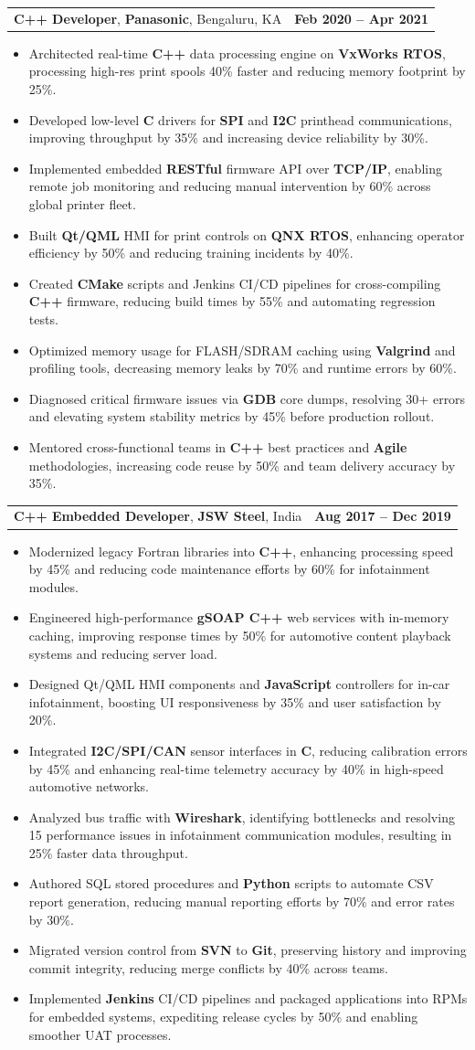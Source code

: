 \documentclass[letterpaper,11pt]{article}
\makeatletter
\newcommand{\resumeItem}[1]{
  \item\footnotesize{
    {#1 \vspace{-2pt}}
  }
}
\newcommand{\resumeSubheading}[4]{
  \vspace{-2pt}\item
    \begin{tabular*}{1.0\textwidth}[t]{l@{\extracolsep{\fill}}r}
      \textbf{\fontsize{10pt}{14pt}\selectfont #3}, \textbf{\fontsize{10pt}{14pt}\selectfont #1}, \fontsize{10pt}{14pt}\selectfont #4 & \textbf{\fontsize{10pt}{14pt}\selectfont #2} \\
    \end{tabular*}\vspace{-7pt}
}
\newcommand{\resumeItemListStart}{\begin{itemize}[leftmargin=*]}
\newcommand{\resumeItemListEnd}{\end{itemize}\vspace{-5pt}}
\makeatother
\begin{document}
    \resumeSubheading
        {Panasonic}{Feb 2020 -- Apr 2021}
        {C++ Developer}{Bengaluru, KA}
      \resumeItemListStart
        \resumeItem{Architected real-time \textbf{C++} data processing engine on \textbf{VxWorks RTOS}, processing high-res print spools 40\% faster and reducing memory footprint by 25\%.}
        \resumeItem{Developed low-level \textbf{C} drivers for \textbf{SPI} and \textbf{I2C} printhead communications, improving throughput by 35\% and increasing device reliability by 30\%.}
        \resumeItem{Implemented embedded \textbf{RESTful} firmware API over \textbf{TCP/IP}, enabling remote job monitoring and reducing manual intervention by 60\% across global printer fleet.}
        \resumeItem{Built \textbf{Qt/QML} HMI for print controls on \textbf{QNX RTOS}, enhancing operator efficiency by 50\% and reducing training incidents by 40\%.}
        \resumeItem{Created \textbf{CMake} scripts and Jenkins CI/CD pipelines for cross-compiling \textbf{C++} firmware, reducing build times by 55\% and automating regression tests.}
        \resumeItem{Optimized memory usage for FLASH/SDRAM caching using \textbf{Valgrind} and profiling tools, decreasing memory leaks by 70\% and runtime errors by 60\%.}
        \resumeItem{Diagnosed critical firmware issues via \textbf{GDB} core dumps, resolving 30+ errors and elevating system stability metrics by 45\% before production rollout.}
        \resumeItem{Mentored cross-functional teams in \textbf{C++} best practices and \textbf{Agile} methodologies, increasing code reuse by 50\% and team delivery accuracy by 35\%.}
      \resumeItemListEnd

    \resumeSubheading
        {JSW Steel}{Aug 2017 -- Dec 2019}
        {C++ Embedded Developer}{India}
      \resumeItemListStart
        \resumeItem{Modernized legacy Fortran libraries into \textbf{C++}, enhancing processing speed by 45\% and reducing code maintenance efforts by 60\% for infotainment modules.}
        \resumeItem{Engineered high-performance \textbf{gSOAP C++} web services with in-memory caching, improving response times by 50\% for automotive content playback systems and reducing server load.}
        \resumeItem{Designed Qt/QML HMI components and \textbf{JavaScript} controllers for in-car infotainment, boosting UI responsiveness by 35\% and user satisfaction by 20\%.}
        \resumeItem{Integrated \textbf{I2C/SPI/CAN} sensor interfaces in \textbf{C}, reducing calibration errors by 45\% and enhancing real-time telemetry accuracy by 40\% in high-speed automotive networks.}
        \resumeItem{Analyzed bus traffic with \textbf{Wireshark}, identifying bottlenecks and resolving 15 performance issues in infotainment communication modules, resulting in 25\% faster data throughput.}
        \resumeItem{Authored SQL stored procedures and \textbf{Python} scripts to automate CSV report generation, reducing manual reporting efforts by 70\% and error rates by 30\%.}
        \resumeItem{Migrated version control from \textbf{SVN} to \textbf{Git}, preserving history and improving commit integrity, reducing merge conflicts by 40\% across teams.}
        \resumeItem{Implemented \textbf{Jenkins} CI/CD pipelines and packaged applications into RPMs for embedded systems, expediting release cycles by 50\% and enabling smoother UAT processes.}
      \resumeItemListEnd
\end{document}

